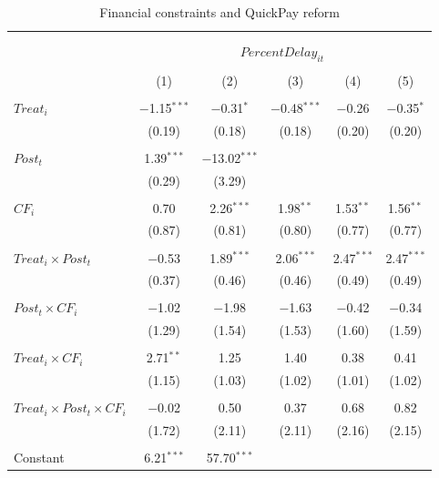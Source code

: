\documentclass[
]{article}
\begin{document}
\begin{table}[H] \centering 
  \caption{Financial constraints and QuickPay reform} 
  \label{} 
\small 
\begin{tabular}{@{\extracolsep{-2pt}}lccccc} 
\\[-1.8ex]\hline 
\hline \\[-1.8ex] 
\\[-1.8ex] & \multicolumn{5}{c}{$PercentDelay_{it}$  } \\ 
\\[-1.8ex] & (1) & (2) & (3) & (4) & (5)\\ 
\hline \\[-1.8ex] 
 $Treat_i$ & $-$1.15$^{***}$ & $-$0.31$^{*}$ & $-$0.48$^{***}$ & $-$0.26 & $-$0.35$^{*}$ \\ 
  & (0.19) & (0.18) & (0.18) & (0.20) & (0.20) \\ 
  & & & & & \\ 
 $Post_t$ & 1.39$^{***}$ & $-$13.02$^{***}$ &  &  &  \\ 
  & (0.29) & (3.29) &  &  &  \\ 
  & & & & & \\ 
 $CF_i$ & 0.70 & 2.26$^{***}$ & 1.98$^{**}$ & 1.53$^{**}$ & 1.56$^{**}$ \\ 
  & (0.87) & (0.81) & (0.80) & (0.77) & (0.77) \\ 
  & & & & & \\ 
 $Treat_i \times Post_t$ & $-$0.53 & 1.89$^{***}$ & 2.06$^{***}$ & 2.47$^{***}$ & 2.47$^{***}$ \\ 
  & (0.37) & (0.46) & (0.46) & (0.49) & (0.49) \\ 
  & & & & & \\ 
 $Post_t \times CF_i$ & $-$1.02 & $-$1.98 & $-$1.63 & $-$0.42 & $-$0.34 \\ 
  & (1.29) & (1.54) & (1.53) & (1.60) & (1.59) \\ 
  & & & & & \\ 
 $Treat_i \times CF_i$ & 2.71$^{**}$ & 1.25 & 1.40 & 0.38 & 0.41 \\ 
  & (1.15) & (1.03) & (1.02) & (1.01) & (1.02) \\ 
  & & & & & \\ 
 $Treat_i \times Post_t \times CF_i$ & $-$0.02 & 0.50 & 0.37 & 0.68 & 0.82 \\ 
  & (1.72) & (2.11) & (2.11) & (2.16) & (2.15) \\ 
  & & & & & \\ 
 Constant & 6.21$^{***}$ & 57.70$^{***}$ &  &  &  \\ 

\end{tabular}
\end{table}
\end{document}
